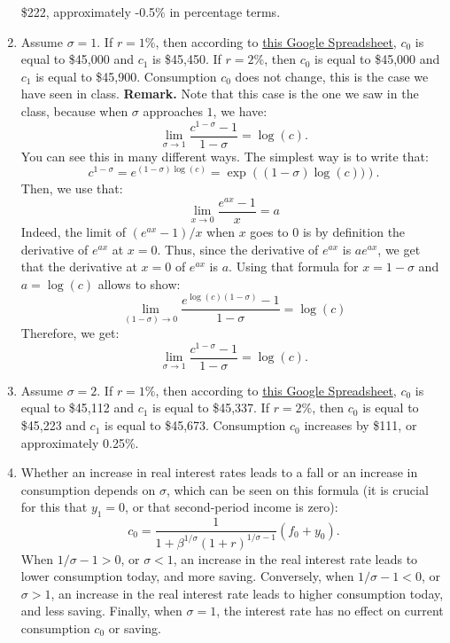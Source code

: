 \documentclass[]{book}
\theoremstyle{definition}
\theoremstyle{definition}
\theoremstyle{definition}
\theoremstyle{remark}
\begin{document}
\begin{enumerate}
  \$222, approximately -0.5\% in percentage terms.
\item
  Assume \(\sigma = 1\). If \(r = 1\%\), then according to
  \href{https://docs.google.com/spreadsheets/d/1dDFa5YZE5170Tv36klHQ19ykK2bP9wjeR0Y1_h-kacg/edit?usp=sharing}{this
  Google Spreadsheet}, \(c_0\) is equal to \$45,000 and \(c_1\) is
  \$45,450. If \(r = 2\%\), then \(c_0\) is equal to \$45,000 and
  \(c_1\) is equal to \$45,900. Consumption \(c_0\) does not change,
  this is the case we have seen in class. \textbf{Remark.} Note that
  this case is the one we saw in the class, because when \(\sigma\)
  approaches \(1\), we have:
  \[\lim_{\sigma \to 1} \frac{c^{1-\sigma}-1}{1-\sigma}=\log(c).\] You
  can see this in many different ways. The simplest way is to write
  that:
  \[c^{1-\sigma}=e^{(1-\sigma)\log(c)}=\exp\left((1-\sigma)\log(c))\right).\]
  Then, we use that: \[\lim_{x \to 0} \frac{e^{ax}-1}{x}=a\] Indeed, the
  limit of \((e^{ax}-1)/x\) when \(x\) goes to \(0\) is by definition
  the derivative of \(e^{ax}\) at \(x=0\). Thus, since the derivative of
  \(e^{ax}\) is \(ae^{ax}\), we get that the derivative at \(x=0\) of
  \(e^{ax}\) is \(a\). Using that formula for \(x = 1-\sigma\) and
  \(a=\log(c)\) allows to show:
  \[\lim_{(1-\sigma) \to 0} \frac{e^{\log(c)(1-\sigma)}-1}{1-\sigma}=\log(c)\]
  Therefore, we get:
  \[\lim_{\sigma \to 1} \frac{c^{1-\sigma}-1}{1-\sigma}=\log(c).\]
\item
  Assume \(\sigma = 2\). If \(r = 1\%\), then according to
  \href{https://docs.google.com/spreadsheets/d/1dDFa5YZE5170Tv36klHQ19ykK2bP9wjeR0Y1_h-kacg/edit?usp=sharing}{this
  Google Spreadsheet}, \(c_0\) is equal to \$45,112 and \(c_1\) is equal
  to \$45,337. If \(r = 2\%\), then \(c_0\) is equal to \$45,223 and
  \(c_1\) is equal to \$45,673. Consumption \(c_0\) increases by \$111,
  or approximately 0.25\%.
\item
  Whether an increase in real interest rates leads to a fall or an
  increase in consumption depends on \(\sigma\), which can be seen on
  this formula (it is crucial for this that \(y_1=0\), or that
  second-period income is zero):
  \[c_0 = \frac{1}{1 +\beta^{1/\sigma}(1+r)^{1/\sigma-1}} \left( f_0 + y_0\right).\]
  When \(1/\sigma-1>0\), or \(\sigma<1\), an increase in the real
  interest rate leads to lower consumption today, and more saving.
  Conversely, when \(1/\sigma-1<0\), or \(\sigma>1\), an increase in the
  real interest rate leads to higher consumption today, and less saving.
  Finally, when \(\sigma=1\), the interest rate has no effect on current
  consumption \(c_0\) or saving.
\end{enumerate}
\end{document}
